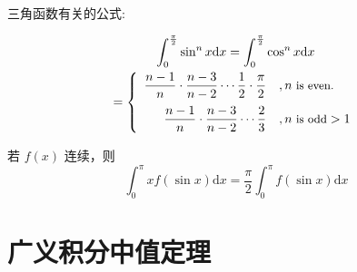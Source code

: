 三角函数有关的公式:
\begin{lemma}[点火公式]
    \begin{multline}\label{eq:launching-formula}
        \int_0^{\frac{\pi}{2}} \sin ^n x \mathrm{d} x = \int_0^{\frac{\pi}{2}} \cos ^n x \mathrm{d} x \\
        = 
        \left\{ 
            \begin{array}{rl}
                \dfrac{n - 1}{n} \cdot \dfrac{n - 3}{n - 2} \cdots \dfrac{1}{2} \cdot \dfrac{\pi}{2} &, n \mbox{\small \ is even.}   \\[1em]
                \dfrac{n - 1}{n} \cdot \dfrac{n - 3}{n - 2} \cdots \dfrac{2}{3}                      &, n \mbox{\small \ is odd} > 1 \\
            \end{array}
        \right.
    \end{multline}
    
    若 $f(x)$ 连续，则
    \begin{equation}
        \int_0^{\pi} x f(\sin x) \mathrm{d} x = \dfrac{\pi}{2} \int_0^{\pi} f(\sin x) \mathrm{d} x
    \end{equation}
\end{lemma}

\section{广义积分中值定理} 

